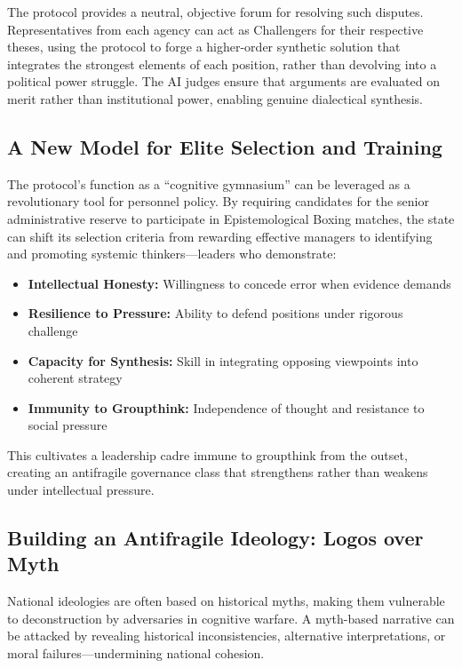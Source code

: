 \documentclass[11pt,a4paper]{article}
\begin{document}
\begin{small}
The protocol provides a neutral, objective forum for resolving such disputes. Representatives from each agency can act as Challengers for their respective theses, using the protocol to forge a higher-order synthetic solution that integrates the strongest elements of each position, rather than devolving into a political power struggle. The AI judges ensure that arguments are evaluated on merit rather than institutional power, enabling genuine dialectical synthesis.

\subsection{A New Model for Elite Selection and Training}
The protocol's function as a ``cognitive gymnasium'' can be leveraged as a revolutionary tool for personnel policy. By requiring candidates for the senior administrative reserve to participate in Epistemological Boxing matches, the state can shift its selection criteria from rewarding effective managers to identifying and promoting systemic thinkers—leaders who demonstrate:

\begin{itemize}[nosep]
    \item \textbf{Intellectual Honesty:} Willingness to concede error when evidence demands
    \item \textbf{Resilience to Pressure:} Ability to defend positions under rigorous challenge
    \item \textbf{Capacity for Synthesis:} Skill in integrating opposing viewpoints into coherent strategy
    \item \textbf{Immunity to Groupthink:} Independence of thought and resistance to social pressure
\end{itemize}

This cultivates a leadership cadre immune to groupthink from the outset, creating an antifragile governance class that strengthens rather than weakens under intellectual pressure.

\subsection{Building an Antifragile Ideology: Logos over Myth}
National ideologies are often based on historical myths, making them vulnerable to deconstruction by adversaries in cognitive warfare. A myth-based narrative can be attacked by revealing historical inconsistencies, alternative interpretations, or moral failures—undermining national cohesion.


\end{small}
\end{document}
